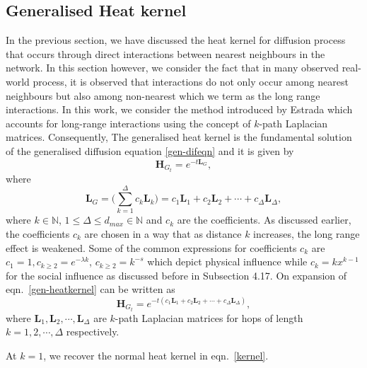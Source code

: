 \documentclass[10pt,a4paper]{article}
\theoremstyle{plain}
\theoremstyle{definition}
\begin{document}
        \subsection{Generalised Heat kernel}
        In the previous section, we have discussed the heat kernel for diffusion process that occurs through direct interactions between nearest neighbours in the network. In this section however, we consider the fact that in many observed real-world process, it is observed that interactions do not only occur among nearest neighbours but also among non-nearest which we term as the long range interactions. In this work, we consider the method introduced by Estrada \citep{estrada2012path} which accounts for long-range interactions using the concept of $k$-path Laplacian matrices. Consequently, The generalised heat kernel is the fundamental solution of the generalised diffusion equation \ref{gen-difeqn} and it is given by 
        \begin{equation}
        \mathbf{H}_{G_t} = e^{-t \mathbf{L}_{G}},
        \end{equation}
        where
        \begin{equation}
        \mathbf{L}_{G} =  \Big(\sum_{k=1}^{\Delta}c_k\mathbf{L}_{k} \Big) = c_{1} \mathbf{L}_{1} + c_{2} \mathbf{L}_{2} + \cdots + c_{\Delta} \mathbf{L}_{\Delta}, 
        \label{gen-heatkernel}
        \end{equation}
        where $k\in \mathbb{N}$, $1 \leq \Delta \leq d_{max} \in \mathbb{N}$ and $c_k$ are the coefficients. As discussed earlier, 
        the coefficients $c_k$  are chosen in a way that as distance $k$ increases, the long range effect is weakened. Some of the common expressions for coefficients $c_k$ are $c_1 =1, c_{k\geq 2} = e^{-\lambda k}$, $ c_{k\geq 2} =k^{-s}$ which depict physical influence while $c_k = kx^{k-1}$ for the social influence as discussed before in Subsection 4.17.
        On expansion of eqn.~\ref{gen-heatkernel} can be written as 
        \begin{equation}
        \mathbf{H}_{G_t} = e^{-t(c_{1}\mathbf{L}_{1} + c_{2}\mathbf{L}_{2} + \cdots + c_{\Delta}\mathbf{L}_{\Delta})},
        \label{heatkernel-hsope}
        \end{equation}
        where $\mathbf{L}_1, \mathbf{L}_2, \cdots, \mathbf{L}_{\Delta}$ are  $k$-path Laplacian matrices for hops of length $k=1,2,\cdots, \Delta$ respectively. 
        
        At $k=1$, we recover the normal heat kernel in eqn.~\ref{kernel}.
        
\end{document}
